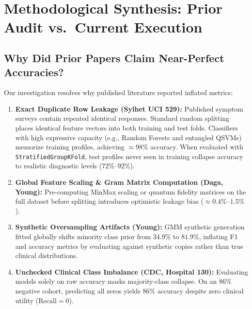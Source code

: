 \documentclass[11pt,a4paper]{article}
\begin{document}
\section{Methodological Synthesis: Prior Audit vs.\ Current Execution}

\subsection{Why Did Prior Papers Claim Near-Perfect Accuracies?}
Our investigation resolves why published literature reported inflated metrics:
\begin{enumerate}[leftmargin=1.5em]
    \item \textbf{Exact Duplicate Row Leakage (Sylhet UCI 529):} Published symptom surveys contain repeated identical responses. Standard random splitting places identical feature vectors into both training and test folds. Classifiers with high expressive capacity (e.g., Random Forests and entangled QSVMs) memorize training profiles, achieving $\approx 98\%$ accuracy. When evaluated with \texttt{StratifiedGroupKFold}, test profiles never seen in training collapse accuracy to realistic diagnostic levels ($72\%$--$92\%$).
    \item \textbf{Global Feature Scaling \& Gram Matrix Computation (Daga, Young):} Pre-computing MinMax scaling or quantum fidelity matrices on the full dataset before splitting introduces optimistic leakage bias ($\approx 0.4\%$--$1.5\%$).
    \item \textbf{Synthetic Oversampling Artifacts (Young):} GMM synthetic generation fitted globally shifts minority class prior from $34.9\%$ to $81.9\%$, inflating F1 and accuracy metrics by evaluating against synthetic copies rather than true clinical distributions.
    \item \textbf{Unchecked Clinical Class Imbalance (CDC, Hospital 130):} Evaluating models solely on raw accuracy masks majority-class collapse. On an $86\%$ negative cohort, predicting all zeros yields $86\%$ accuracy despite zero clinical utility ($\text{Recall} = 0$).
\end{enumerate}

\end{document}
